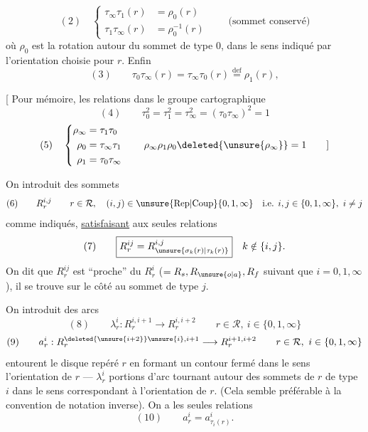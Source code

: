 \[
 (2)\quad
 \left\{\begin{aligned}
 \tau_\infty\tau_1(r)&=\rho_0(r)\\
 \tau_1\tau_\infty(r)&=\rho_0^{-1}(r)
 \end{aligned}\right.
 \qquad\text{(sommet conservé)}
\]
où $\rho_0$ est la rotation  autour du sommet de type $0$, dans le sens indiqué par l'orientation choisie pour $r$. Enfin
\[
 (3)\qquad\tau_0\tau_\infty(r)=\tau_\infty\tau_0(r)\overset{\mathrm{def}}=\rho_1(r),
\]

[ Pour mémoire, les relations dans le groupe cartographique
\[
 (4)\qquad\tau_0^2=\tau_1^2=\tau_\infty^2=(\tau_0\tau_\infty)^2=1
\]
\[
 (5)\quad
 \left\{\begin{aligned}
 \rho_\infty&=\tau_1\tau_0\\
 \rho_0&=\tau_\infty\tau_1\\
 \rho_1&=\tau_0\tau_\infty
 \end{aligned}\right.
 \qquad\rho_\infty\rho_1\rho_0\deleted{\unsure{\rho_\infty}}=1
 \qquad\text{]}
\]


On introduit des sommets
\[
(6)\qquad R_r^{i,j}\qquad r\in\mathcal{R},\quad (i,j)\in\operatorname{\unsure{Rep|Coup}}\{0,1,\infty\}\quad\text{i.e. }i,j\in\{0,1,\infty\},\ i\ne j
\]
comme indiqués, \uline{satisfaisant} aux seules relations
\[
(7)\qquad \boxed{R_r^{ij}=R_{\unsure{\sigma_k(r)|\tau_k(r)}}^{i,j}}\quad k\notin\{i,j\}.
\]
On dit que $R_r^{ij}$ est ``proche'' du $R_r^i$  ($=R_s,R_{\unsure{o|a}},R_f$ suivant que $i=0,1,\infty$), il se trouve sur le côté    au sommet de type $j$.

On introduit des arcs
\[
(8)\qquad \lambda_r^i:R_r^{i,i+1}\longrightarrow R_r^{i,i+2}\qquad r\in\mathcal{R},\ i\in\{0,1,\infty\}
\]
\[
(9)\qquad a_r^i:R_r^{\deleted{\unsure{i+2}}\unsure{i},i+1}\longrightarrow R_r^{i+1,i+2}\qquad r\in\mathcal{R},\ i\in\{0,1,\infty\}
\]
  entourent le disque repéré $r$ en formant un contour fermé dans le sens   l'orientation de $r$ ---   $\lambda_r^i$   portions d'arc tournant autour des sommets de $r$ de type $i$ dans le sens correspondant à l'orientation de $r$. (Cela  semble préférable à la convention de notation inverse). On a les seules  relations
\[
(10)\qquad \boxed{a_r^i=a_{\tau_i(r)}^i}.
\]

